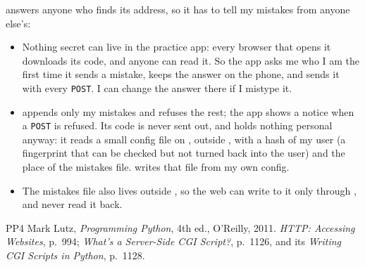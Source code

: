 \documentclass[11pt,a4paper]{article}
\begin{document}
 answers anyone who finds its address, so it has to tell my mistakes from anyone else's:

\begin{itemize}[leftmargin=1.2em]
  \item Nothing secret can live in the practice app: every browser that opens it downloads its code, and anyone can read it. So the app asks me who I am the first time it sends a mistake, keeps the answer on the phone, and sends it with every \texttt{POST}. I can change the answer there if I mistype it.
  \item {} appends only my mistakes and refuses the rest; the app shows a notice when a \texttt{POST} is refused. Its code is never sent out, and holds nothing personal anyway: it reads a small config file on , outside , with a hash of my user (a fingerprint that can be checked but not turned back into the user) and the place of the mistakes file.  writes that file from my own config.
  \item The mistakes file also lives outside , so the web can write to it only through , and never read it back.
\end{itemize}

\begin{thebibliography}{PP4}
   Mark Lutz, \textit{Programming Python}, 4th ed., O'Reilly, 2011. \textit{HTTP: Accessing Websites}, p.~994; \textit{What's a Server-Side CGI Script?}, p.~1126, and its \textit{Writing CGI Scripts in Python}, p.~1128.
\end{thebibliography}

\revisiontable
\end{document}
